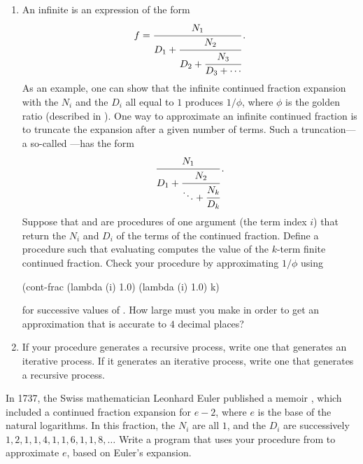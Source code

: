\begin{exercise}
	\label{Exercise 1.37}
	\begin{enumerate}[label = \alph*., leftmargin = *]

		\item
			An infinite  is an expression of the form
			\[
				f = \cfrac{N_1}{D_1 + \cfrac{N_2}{D_2 + \cfrac{N_3}{D_3 + \dotsb}}} \,.
			\]
			As an example, one can show that the infinite continued fraction expansion with the \( N_i \) and the \( D_i \) all equal to \( 1 \) produces \( 1 / ϕ \), where \( ϕ \) is the golden ratio (described in ).
			One way to approximate an infinite continued fraction is to truncate the expansion after a given number of terms.
			Such a truncation---a so-called ---has the form
			\[
				\cfrac{N_1}{D_1 + \cfrac{N_2}{\ddots + \cfrac{N_k}{D_k}}} \,.
			\]
			Suppose that  and  are procedures of one argument (the term index \( i \)) that return the \( N_i \) and \( D_i \) of the terms of the continued fraction.
			Define a procedure  such that evaluating  computes the value of the \( k \)-term finite continued fraction.
			Check your procedure by approximating \( 1 / ϕ \) using
			\begin{scheme}
			  (cont-frac (lambda (i) 1.0)
			             (lambda (i) 1.0)
			             k)
			\end{scheme}
			for successive values of .
			How large must you make  in order to get an approximation that is accurate to \( 4 \) decimal places?

		\item
			If your  procedure generates a recursive process, write one that generates an iterative process.
			If it generates an iterative process, write one that generates a recursive process.

	\end{enumerate}
\end{exercise}



\begin{exercise}
	\label{Exercise 1.38}
	In 1737, the Swiss mathematician Leonhard Euler published a memoir , which included a continued fraction expansion for \( e - 2 \), where \( e \) is the base of the natural logarithms.
	In this fraction, the \( N_i \) are all \( 1 \), and the \( D_i \) are successively \( 1, 2, 1, 1, 4, 1, 1, 6, 1, 1, 8, \dotsc \)
	Write a program that uses your  procedure from  to approximate \( e \), based on Euler’s expansion.
\end{exercise}



